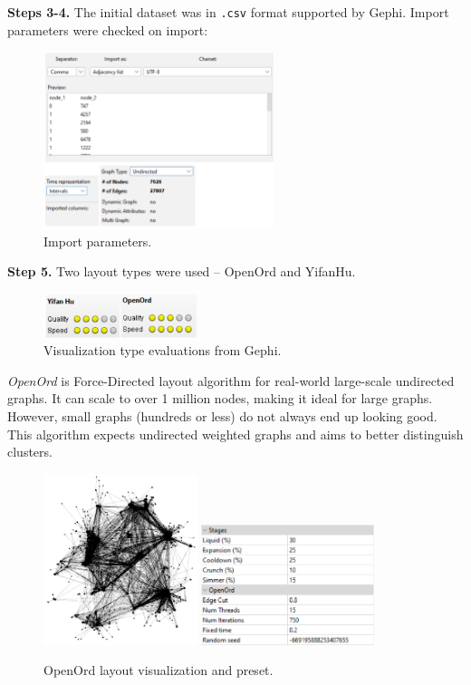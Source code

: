 \documentclass[12pt, a4paper]{article}
\begin{document}
\newpage

\textbf{Steps 3-4.} The initial dataset was in \texttt{.csv} format supported by Gephi. Import parameters were checked on import:
\begin{figure}[!h]
\centering
\includegraphics[width=0.6\textwidth]{s4p1.png}
\caption{Import parameters.}
\end{figure}

\textbf{Step 5.} Two layout types were used -- OpenOrd and YifanHu.
\begin{figure}[!h]
\centering
\includegraphics[width=0.4\textwidth]{s5p1.png}
\caption{Visualization type evaluations from Gephi.}
\end{figure}
\textit{OpenOrd} is Force-Directed layout algorithm for real-world large-scale undirected graphs. It can scale to over 1 million nodes, making it ideal for large graphs. However, small graphs (hundreds or less) do not always end up looking good. This algorithm expects undirected weighted graphs and aims to better distinguish clusters.
\begin{figure}[!h]
\centering
\includegraphics[width=0.4\textwidth]{s5p2.png} \hspace{5mm}
\includegraphics[width=0.45\textwidth]{s5p3.png}
\caption{OpenOrd layout visualization and preset.}
\end{figure}
\end{document}
